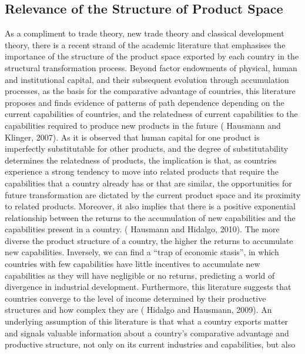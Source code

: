 \documentclass[12pt]{article}%
\begin{document}
%
\subsection{Relevance of the Structure of Product Space}%
\label{subsec:RelevanceoftheStructureofProductSpace}%

%
As a compliment to trade theory, new trade theory and classical
development theory, there is a recent strand of the academic literature
that emphasises the importance of the structure of the product space
exported by each country in the structural transformation process.
Beyond factor endowments of physical, human and institutional capital,
and their subsequent evolution through accumulation processes, as the
basis for the comparative advantage of countries, this literature
proposes and finds evidence of patterns of path dependence depending on
the current capabilities of countries, and the relatedness of current
capabilities to the capabilities required to produce new products in the
future (\cite{hausmann_structure_2007} Hausmann and Klinger, 2007). As it is observed that human
capital for one product is imperfectly substitutable for other products,
and the degree of substitutability determines the relatedness of
products, the implication is that, as countries experience a strong
tendency to move into related products that require the capabilities
that a country already has or that are similar, the opportunities for
future transformation are dictated by the current product space and its
proximity to related products. Moreover, it also implies that there is a
positive exponential relationship between the returns to the
accumulation of new capabilities and the capabilities present in a
country. (\cite{hausmann_country_2010} Hausmann and Hidalgo, 2010). The more diverse the product
structure of a country, the higher the returns to accumulate new
capabilities. Inversely, we can find a ``trap of economic stasis'', in
which countries with few capabilities have little incentives to
accumulate new capabilities as they will have negligible or no returns,
predicting a world of divergence in industrial development. Furthermore,
this literature suggests that countries converge to the level of income
determined by their productive structures and how complex they are
(\cite{hidalgo_building_2009} Hidalgo and Hausmann, 2009). An underlying assumption of this
literature is that what a country exports matter and signals valuable
information about a country's comparative advantage and productive
structure, not only on its current industries and capabilities, but also
\end{document}
